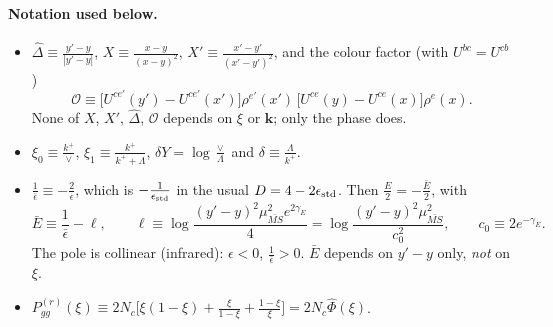 \documentclass[10pt]{article}
\numberwithin{equation}{section}
\newcommand{\Dh}{\hat\Delta}
\newcommand{\OO}{\mathcal O}
\begin{document}
\paragraph{Notation used below.}
\begin{itemize}
\item $\Dh\equiv\frac{y'-y}{|y'-y|}$, $X\equiv\frac{x-y}{(x-y)^2}$, $X'\equiv\frac{x'-y'}{(x'-y')^2}$, and the colour factor (with $U^{bc}=U^{cb}$)
\begin{equation}
\OO\equiv\big[U^{ce'}(y')-U^{ce'}(x')\big]\rho^{e'}(x')\,\big[U^{ce}(y)-U^{ce}(x)\big]\rho^{e}(x).
\end{equation}
None of $X$, $X'$, $\Dh$, $\OO$ depends on $\xi$ or $\mathbf k$; only the phase does.
\item $\xi_0\equiv\frac{k^+}{\vee}$, $\xi_1\equiv\frac{k^+}{k^++\Lambda}$, $\delta Y=\log\frac{\vee}{\Lambda}$ and $\delta\equiv\frac{\Lambda}{k^+}$.
\item $\frac1{\bar\epsilon}\equiv-\frac2\epsilon$, which is $-\frac{1}{\epsilon_{\rm std}}$ in the usual $D=4-2\epsilon_{\rm std}$. Then $\frac{E}{2}=-\frac{\bar E}{2}$, with
\begin{equation}
\bar E\equiv\frac1{\bar\epsilon}-\ell,\qquad \ell\equiv\log\frac{(y'-y)^2\mu^2_{\overline{MS}}e^{2\gamma_E}}{4}=\log\frac{(y'-y)^2\mu^2_{\overline{MS}}}{c_0^2},\qquad c_0\equiv2e^{-\gamma_E}.
\end{equation}
The pole is collinear (infrared): $\epsilon<0$, $\frac1{\bar\epsilon}>0$. $\bar E$ depends on $y'-y$ only, \emph{not} on $\xi$.
\item $P^{(r)}_{gg}(\xi)\equiv2N_c\big[\xi(1-\xi)+\frac{\xi}{1-\xi}+\frac{1-\xi}{\xi}\big]=2N_c\hat\Phi(\xi)$.
\end{itemize}

\end{document}
